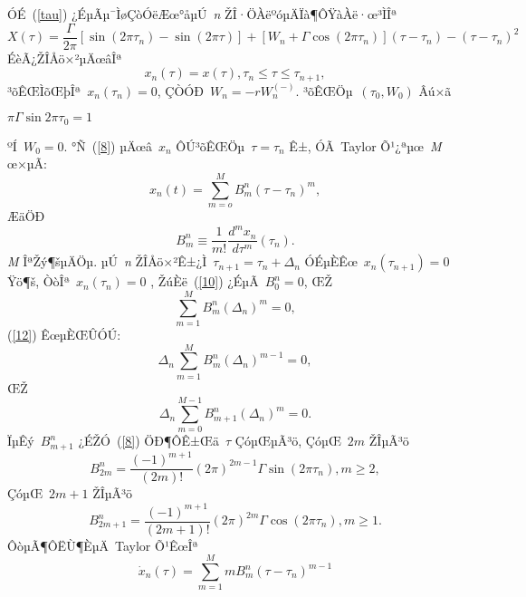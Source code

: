 \documentclass[12pt,openany,CJK,oneside]{cctbook}
\begin{document}
{ÓÉ\ (\ref{tau}) ¿ÉµÃµ¯ÌøÇòÓëÆœ°åµÚ\ \emph{n} ŽÎ·ÖÀëºóµÄÏà¶ÔŸàÀë·œ³ÌÎª
\begin{equation}\label{8}
  X(\tau)=\frac{\Gamma}{2\pi}[\sin(2\pi\tau_{n})-\sin(2\pi\tau)]+[W_{n}+\Gamma\cos(2\pi\tau_{n})](\tau-\tau_{n})-(\tau-\tau_{n})^{2}
\end{equation}
ÉèÃ¿ŽÎÅö×²µÄœâÎª
\begin{equation}\label{9}
  x_{n}(\tau)=x(\tau),\tau_{n}\leq\tau\leq\tau_{n+1},
\end{equation}
³õÊŒÌõŒþÎª\ $x_{n}(\tau_{n})=0$, ÇÒÓÐ\ $W_{n}=-rW_{n}^{(-)}$. ³õÊŒÖµ\ $(\tau_0,W_0)$ Âú×ã\
\begin{center}
$\pi\Gamma\sin2\pi\tau_{0}=1$
\end{center}
 ºÍ\ $W_{0}=0$.
°Ñ\ (\ref{8}) µÄœâ\ $ x_n$ ÔÚ³õÊŒÖµ\ $\tau=\tau_{n}$ Ê±, ÓÃ\ Taylor Õ¹¿ªµœ\ \emph{M} œ×µÃ:
\begin{equation}\label{10}
  x_{n}(t)=\sum_{m=o}^{M} B_{m}^{n}(\tau-\tau_{n})^{m},
\end{equation}
ÆäÖÐ
\begin{equation}\label{11}
  B_{m}^{n}\equiv\frac{1}{m!}\frac{d^{m}x_{n}}{d\tau^{m}}(\tau_{n}).
\end{equation}
\emph{M} ÎªŽý¶šµÄÖµ. µÚ\ \emph{n} ŽÎÅö×²Ê±¿Ì\ $\tau_{n+1}=\tau_{n}+\Delta_{n}$ ÓÉµÈÊœ\ $x_{n}(\tau_{n+1})=0$ Ÿö¶š, ÒòÎª\ $x_{n}(\tau_{n})=0$ ,
ŽúÈë\ (\ref{10}) ¿ÉµÃ\ $B_{0}^{n}=0$, ŒŽ
\begin{equation}\label{12}
  \sum_{m=1}^{M}B_{m}^{n}(\Delta_{n})^{m}=0,
\end{equation}
(\ref{12}) ÊœµÈŒÛÓÚ:
\begin{equation}\label{13}
  \Delta_{n}\sum_{m=1}^{M}B_{m}^{n}(\Delta_{n})^{m-1}=0,
\end{equation}
ŒŽ
\begin{equation}\label{14}
  \Delta_{n}\sum_{m=0}^{M-1}B_{m+1}^{n}(\Delta_{n})^{m}=0.
\end{equation}
ÏµÊý\ $B_{m+1}^{n}$ ¿ÉŽÓ\ (\ref{8}) ÖÐ¶ÔÊ±Œä\ $\tau$ ÇóµŒµÃ³ö, ÇóµŒ\ $2m$ ŽÎµÃ³ö
\begin{equation}\label{15}
  B_{2m}^{n}=\frac{(-1)^{m+1}}{(2m)!}(2\pi)^{2m-1}\Gamma\sin(2\pi\tau_{n}),m\geq2,
\end{equation}
ÇóµŒ\ $2m+1$ ŽÎµÃ³ö
\begin{equation}\label{16}
  B_{2m+1}^{n}=\frac{(-1)^{m+1}}{(2m+1)!}(2\pi)^{2m}\Gamma\cos(2\pi\tau_{n}),m\geq1.
\end{equation}
ÔòµÃ¶ÔËÙ¶ÈµÄ\ Taylor Õ¹ÊœÎª
\begin{equation}\label{17}
  \dot{x}_{n}(\tau)=\sum_{m=1}^{M} mB_{m}^{n}(\tau-\tau_{n})^{m-1}

\end{equation}}
\end{document}
